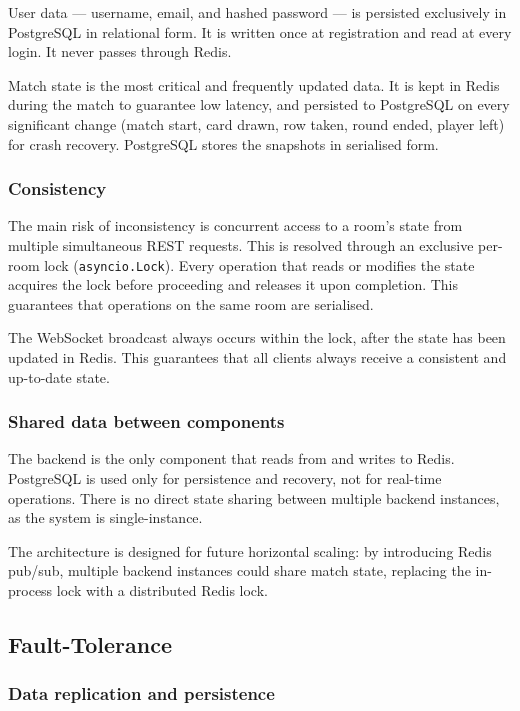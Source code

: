 \documentclass{scrartcl}
\begin{document}
User data --- username, email, and hashed password --- is persisted exclusively
in PostgreSQL in relational form.
It is written once at registration and read at every login.
It never passes through Redis.

Match state is the most critical and frequently updated data.
It is kept in Redis during the match to guarantee low latency,
and persisted to PostgreSQL on every significant change
(match start, card drawn, row taken, round ended, player left)
for crash recovery.
PostgreSQL stores the snapshots in serialised form.

\subsubsection*{Consistency}

The main risk of inconsistency is concurrent access to a room's state
from multiple simultaneous REST requests.
This is resolved through an exclusive per-room lock (\texttt{asyncio.Lock}).
Every operation that reads or modifies the state acquires the lock before
proceeding and releases it upon completion.
This guarantees that operations on the same room are serialised.

The WebSocket broadcast always occurs within the lock, after the state
has been updated in Redis.
This guarantees that all clients always receive a consistent and up-to-date state.

\subsubsection*{Shared data between components}

The backend is the only component that reads from and writes to Redis.
PostgreSQL is used only for persistence and recovery, not for real-time operations.
There is no direct state sharing between multiple backend instances,
as the system is single-instance.

The architecture is designed for future horizontal scaling:
by introducing Redis pub/sub, multiple backend instances could share match state,
replacing the in-process lock with a distributed Redis lock.

\subsection{Fault-Tolerance}\label{fault-tolerance}

\subsubsection*{Data replication and persistence}
\end{document}

